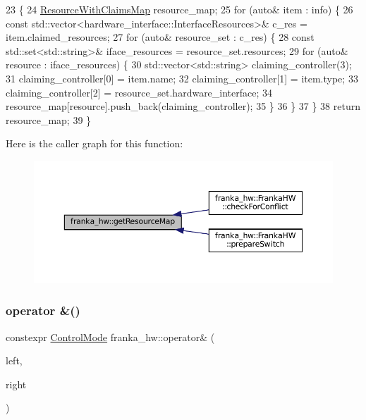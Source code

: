 \begin{DoxyCode}
23                                                                                             \{
24   \hyperlink{namespacefranka__hw_a1fae0c56c9a08fdeb137e601f876cc77}{ResourceWithClaimsMap} resource\_map;
25   \textcolor{keywordflow}{for} (\textcolor{keyword}{auto}& item : info) \{
26     \textcolor{keyword}{const} std::vector<hardware\_interface::InterfaceResources>& c\_res = item.claimed\_resources;
27     \textcolor{keywordflow}{for} (\textcolor{keyword}{auto}& resource\_set : c\_res) \{
28       \textcolor{keyword}{const} std::set<std::string>& iface\_resources = resource\_set.resources;
29       \textcolor{keywordflow}{for} (\textcolor{keyword}{auto}& resource : iface\_resources) \{
30         std::vector<std::string> claiming\_controller(3);
31         claiming\_controller[0] = item.name;
32         claiming\_controller[1] = item.type;
33         claiming\_controller[2] = resource\_set.hardware\_interface;
34         resource\_map[resource].push\_back(claiming\_controller);
35       \}
36     \}
37   \}
38   \textcolor{keywordflow}{return} resource\_map;
39 \}
\end{DoxyCode}
Here is the caller graph for this function\+:
\nopagebreak
\begin{figure}[H]
\begin{center}
\leavevmode
\includegraphics[width=350pt]{namespacefranka__hw_a6c621829dd30c8ff939de6ae0861966d_icgraph}
\end{center}
\end{figure}
\mbox{\label{namespacefranka__hw_a4f7ed8f97d695218717ee59ea579b5b0}} 
\subsubsection{\texorpdfstring{operator \&()}{operator \&()}}
{\footnotesize\ttfamily constexpr \hyperlink{namespacefranka__hw_afa416558ce4baace5ac6c71bd5d2c98c}{Control\+Mode} franka\+\_\+hw\+::operator\& (\begin{DoxyParamCaption}\item[{\hyperlink{namespacefranka__hw_afa416558ce4baace5ac6c71bd5d2c98c}{Control\+Mode}}]{left,  }\item[{\hyperlink{namespacefranka__hw_afa416558ce4baace5ac6c71bd5d2c98c}{Control\+Mode}}]{right }\end{DoxyParamCaption})}



